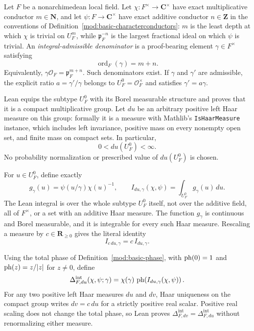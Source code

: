 \begin{definition}\label{mod:delta-integraldefinition}
Let $F$ be a nonarchimedean local field.  Let
$\chi:F^\times\to\mathbf C^\times$ have exact multiplicative conductor
$m\in\mathbf N$, and let $\psi:F\to\mathbf C^\times$ have exact additive
conductor $n\in\mathbf Z$ in the conventions of
Definition~\ref{mod:basic-characterconductors}: $m$ is the least depth at
which $\chi$ is trivial on $U_F^m$, while $\mathfrak p_F^{-n}$ is the
largest fractional ideal on which $\psi$ is trivial.  An
\emph{integral-admissible denominator} is a proof-bearing element
$\gamma\in F^\times$ satisfying
\[
  \operatorname{ord}_F(\gamma)=m+n.
\]
Equivalently, $\gamma\mathcal O_F=\mathfrak p_F^{m+n}$.  Such
denominators exist.  If $\gamma$ and $\gamma'$ are admissible, the
explicit ratio $a=\gamma'/\gamma$ belongs to
$U_F^0=\mathcal O_F^\times$ and satisfies $\gamma'=a\gamma$.

Lean equips the subtype $U_F^0$ with its Borel measurable structure and
proves that it is a compact multiplicative group.  Let $du$ be an arbitrary
positive left Haar measure on this group: formally it is a measure with
Mathlib's \texttt{IsHaarMeasure} instance, which includes left invariance,
positive mass on every nonempty open set, and finite mass on compact sets.
In particular,
\[
  0<du(U_F^0)<\infty.
\]
No probability normalization or prescribed value of $du(U_F^0)$ is chosen.

For $u\in U_F^0$, define exactly
\[
  g_\gamma(u)=\psi(u/\gamma)\chi(u)^{-1},
  \qquad
  I_{du,\gamma}(\chi,\psi)
    =\int_{U_F^0}g_\gamma(u)\,du.
\]
The Lean integral is over the whole subtype $U_F^0$ itself, not over the
additive field, all of $F^\times$, or a set with an additive Haar measure.
The function $g_\gamma$ is continuous and Borel measurable, and it is
integrable for every such Haar measure.  Rescaling a measure by
$c\in\mathbf R_{\geq0}$ gives the literal identity
\[
  I_{c\,du,\gamma}=c\,I_{du,\gamma}.
\]

Using the total phase of Definition~\ref{mod:basic-phase}, with
$\operatorname{ph}(0)=1$ and $\operatorname{ph}(z)=z/|z|$ for $z\ne0$, define
\[
  \Delta^{\mathrm{int}}_{F,du}(\chi,\psi;\gamma)
    =\chi(\gamma)\,\operatorname{ph}\!\left(I_{du,\gamma}(\chi,\psi)\right).
\]
For any two positive left Haar measures $du$ and $dv$, Haar uniqueness on
the compact group writes $dv=c\,du$ for a strictly positive real scalar.
Positive real scaling does not change the total phase, so Lean proves
$\Delta^{\mathrm{int}}_{F,dv}=\Delta^{\mathrm{int}}_{F,du}$ without
renormalizing either measure.


\end{definition}
